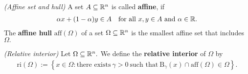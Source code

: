 \begin{definition}
  \emph{(Affine set and hull)}
  A set 
  $A\subseteq \mathbb{R}^n$
  is called \textbf{affine}, if
  \begin{gather}
    \alpha x + (1-\alpha)y \in A
    \quad
    \text{for all}
    \ 
    x,y \in A
    \ 
    \text{and}
    \ 
    \alpha \in \R.
  \end{gather}
  The \textbf{affine hull} 
  $\mathrm{aff}(\Omega)$
  of a set 
  $\Omega\subseteq \mathbb{R}^n$
  is the smallest affine set that includes $\Omega.$
\end{definition}

\begin{definition}
  \emph{(Relative interior)}
  Let 
  $\Omega\subseteq \mathbb{R}^n.$
  We define the \textbf{relative interior} of $\Omega$ by
  \begin{gather}
    \mathrm{ri}(\Omega)
    :=
    \left\{ 
      x \in \Omega 
      \colon
      \text{there exists}\ 
      \gamma > 0\ 
      \text{such that}\ 
      \mathrm{B}_\gamma(x)
      \cap
      \mathrm{aff}(\Omega)
      \in
      \Omega
    \right\}.
  \end{gather}


\end{definition}
